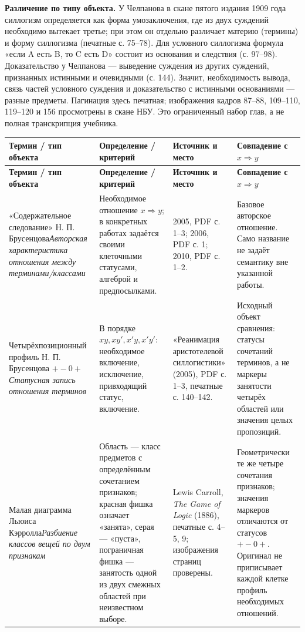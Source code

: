 \documentclass[12pt,a4paper]{article}
\begin{document}
\textbf{Различение по типу объекта.} У Челпанова в скане пятого издания 1909 года силлогизм определяется как форма умозаключения, где из двух суждений необходимо вытекает третье; при этом он отдельно различает материю (термины) и форму силлогизма (печатные с. 75–78). Для условного силлогизма формула «если A есть B, то C есть D» состоит из основания и следствия (с. 97–98). Доказательство у Челпанова — выведение суждения из других суждений, признанных истинными и очевидными (с. 144). Значит, необходимость вывода, связь частей условного суждения и доказательство с истинными основаниями — разные предметы. Пагинация здесь печатная; изображения кадров 87–88, 109–110, 119–120 и 156 просмотрены в скане НБУ. Это ограниченный набор глав, а не полная транскрипция учебника.

{\small
\setlength{\tabcolsep}{3pt}
\begin{longtable}{P{0.18\textwidth}P{0.28\textwidth}P{0.18\textwidth}P{0.23\textwidth}}
\toprule
\textbf{Термин / тип объекта} & \textbf{Определение / критерий} & \textbf{Источник и место} & \textbf{Совпадение с \(x\Rightarrow y\)} \\
\midrule
\endfirsthead
\toprule
\textbf{Термин / тип объекта} & \textbf{Определение / критерий} & \textbf{Источник и место} & \textbf{Совпадение с \(x\Rightarrow y\)} \\
\midrule
\endhead
«Содержательное следование» Н. П. Брусенцова\newline\emph{Авторская характеристика отношения между терминами/классами} & Необходимое отношение \(x\Rightarrow y\); в конкретных работах задаётся своими клеточными статусами, алгеброй и предпосылками. & 2005, PDF с. 1–3; 2006, PDF с. 1; 2010, PDF с. 1–2. & Базовое авторское отношение. Само название не задаёт семантику вне указанной работы. \\
Четырёхпозиционный профиль Н. П. Брусенцова \(+-0+\)\newline\emph{Статусная запись отношения терминов} & В порядке \(xy,xy',x'y,x'y'\): необходимое включение, исключение, привходящий статус, включение. & «Реанимация аристотелевой силлогистики» (2005), PDF с. 1–3, печатные с. 140–142. & Исходный объект сравнения: статусы сочетаний терминов, а не маркеры занятости четырёх областей или значения целых пропозиций. \\
Малая диаграмма Льюиса Кэрролла\newline\emph{Разбиение классов вещей по двум признакам} & Область — класс предметов с определённым сочетанием признаков; красная фишка означает «занята», серая — «пуста», пограничная фишка — занятость одной из двух смежных областей при неизвестном выборе. & Lewis Carroll, \emph{The Game of Logic} (1886), печатные с. 4–5, 9; изображения страниц проверены. & Геометрически те же четыре сочетания признаков; значения маркеров отличаются от статусов \(+-0+\). Оригинал не приписывает каждой клетке профиль необходимых отношений. \\

\end{longtable}}
\end{document}

